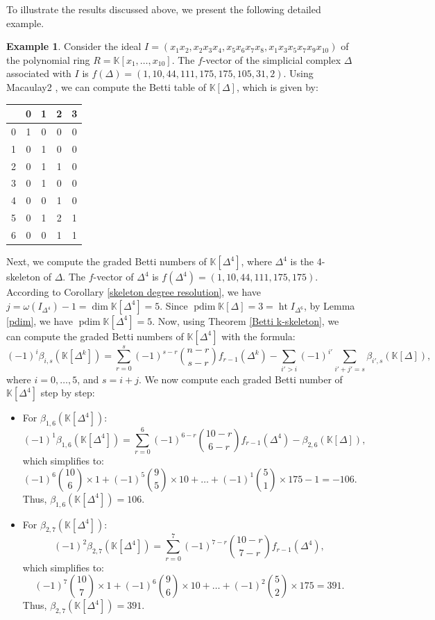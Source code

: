 \documentclass[a4paper,12pt]{amsart}
\numberwithin{equation}{section}
\theoremstyle{definition}
\newtheorem{example}[theorem]{Example}
\newcommand{\K}[0]{\mathbb{K}}
\DeclareMathOperator{\pdim}{pdim}
\DeclareMathOperator{\hte}{ht}
\begin{document}
To illustrate the results discussed above, we present the following detailed example.
\begin{example}
	Consider the ideal $I=(x_1x_2,x_2x_3x_4,x_5x_6x_7x_8,x_1x_3x_5x_7x_9x_{10})$ of the polynomial ring $R=\K[x_1,\dots,x_{10}]$. The $f$-vector of the simplicial complex $\Delta$ associated with $I$ is $f(\Delta)=(1,10,44,111,175,175,105,31,2)$. Using Macaulay2 \cite{M2}, we can compute the Betti table of $\K[\Delta]$, which is given by:
	\begin{center}
		\begin{tabular}{c|cccc} 
			& 0 & 1 & 2 & 3 \\
			\hline 0 & 1 & 0 & 0 & 0 \\
			1 & 0 & 1 & 0 & 0 \\
			2 & 0 & 1 & 1 & 0 \\
			3 & 0 & 1& 0 & 0 \\
			4 & 0 & 0 & 1 & 0 \\
			5 & 0 & 1 & 2 & 1\\
			6 & 0 & 0 & 1 & 1
		\end{tabular}
	\end{center}
	Next, we compute the graded Betti numbers of $\K[\Delta^4]$, where $\Delta^4$ is the 4-skeleton of $\Delta$. The $f$-vector of $\Delta^4$ is $f(\Delta^4)=(1,10,44,111,175,175)$.
	According to Corollary \ref{skeleton degree resolution}, we have $j=\omega(I_{\Delta^4})-1=\dim\K[\Delta^4]=5$. Since $\pdim\K[\Delta]=3=\hte I_{\Delta^6}$, by Lemma \ref{pdim}, we have $\pdim\K[\Delta^4]=5$. Now, using Theorem \ref{Betti k-skeleton}, we can compute the graded Betti numbers of $\K[\Delta^4]$ with the formula:
	$$(-1)^{i}\beta_{i,s}(\K[\Delta^k])=\sum_{r=0}^{s}(-1)^{s-r}\binom{n-r}{s-r}f_{r-1}(\Delta^k)-\sum_{i'>i}(-1)^{i'}\sum_{i'+j'=s}\beta_{i',s}(\K[\Delta]),$$
	where $i=0,\dots,5$, and $s=i+j$. We now compute each graded Betti number of $\K[\Delta^4]$ step by step:
	\begin{itemize}
		\item For $\beta_{1,6}(\K[\Delta^4])$:
		$$(-1)^1 \beta_{1,6}(\K[\Delta^4])=\sum_{r=0}^{6}(-1)^{6-r} \binom{10-r}{6-r}f_{r-1}(\Delta^4)-\beta_{2,6}(\K[\Delta]),$$
		which simplifies to:
		$$(-1)^6\binom{10}{6}\times1+(-1)^5\binom{9}{5}\times 10+\dots+(-1)^1\binom{5}{1}\times175-1=-106.$$
		Thus, $\beta_{1,6}(\K[\Delta^4])=106$.
		
		\item For $\beta_{2,7}(\K[\Delta^4])$:
		$$(-1)^2\beta_{2,7}(\K[\Delta^4])=\sum_{r=0}^{7}(-1)^{7-r}\binom{10-r}{7-r}f_{r-1}(\Delta^4),$$
		which simplifies to:
		$$(-1)^7\binom{10}{7}\times1+(-1)^6\binom{9}{6}\times10+\dots+(-1)^2\binom{5}{2}\times175=391.$$
		Thus, $\beta_{2,7}(\K[\Delta^4])=391$.
		

\end{itemize}
\end{example}
\end{document}
